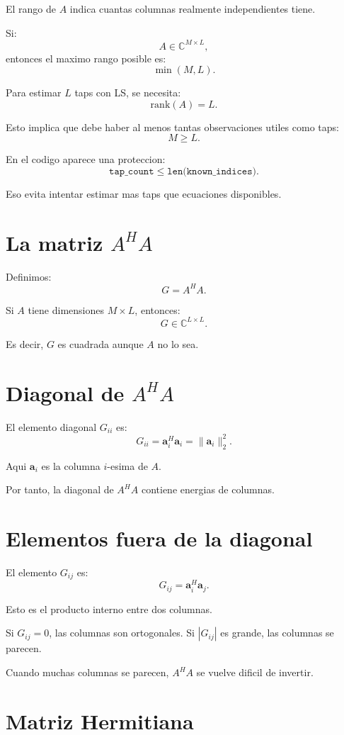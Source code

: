 \documentclass[11pt]{article}
\begin{document}
El rango de \(A\) indica cuantas columnas realmente independientes tiene.

Si:
\[
    A \in \mathbb{C}^{M\times L},
\]
entonces el maximo rango posible es:
\[
    \min(M,L).
\]

Para estimar \(L\) taps con LS, se necesita:
\[
    \mathrm{rank}(A)=L.
\]

Esto implica que debe haber al menos tantas observaciones utiles como taps:
\[
    M \ge L.
\]

En el codigo aparece una proteccion:
\[
    \texttt{tap\_count} \le \texttt{len(known\_indices)}.
\]

Eso evita intentar estimar mas taps que ecuaciones disponibles.

\section{La matriz \(A^H A\)}

Definimos:
\[
    G = A^H A.
\]

Si \(A\) tiene dimensiones \(M\times L\), entonces:
\[
    G \in \mathbb{C}^{L\times L}.
\]

Es decir, \(G\) es cuadrada aunque \(A\) no lo sea.

\section{Diagonal de \(A^H A\)}

El elemento diagonal \(G_{ii}\) es:
\[
    G_{ii} = \bm a_i^H \bm a_i = \|\bm a_i\|_2^2.
\]

Aqui \(\bm a_i\) es la columna \(i\)-esima de \(A\).

Por tanto, la diagonal de \(A^H A\) contiene energias de columnas.

\section{Elementos fuera de la diagonal}

El elemento \(G_{ij}\) es:
\[
    G_{ij} = \bm a_i^H \bm a_j.
\]

Esto es el producto interno entre dos columnas.

Si \(G_{ij}=0\), las columnas son ortogonales. Si \(|G_{ij}|\) es grande, las
columnas se parecen.

Cuando muchas columnas se parecen, \(A^H A\) se vuelve dificil de invertir.

\section{Matriz Hermitiana}
\end{document}
